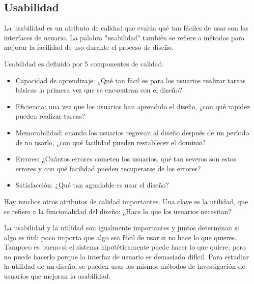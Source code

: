 \thispagestyle{plain}
\subsection{Usabilidad}
	\par 
		La usabilidad es un atributo de calidad que evalúa qué tan fáciles de usar son las interfaces de usuario. La palabra "usabilidad" también se refiere a métodos para mejorar la facilidad de uso durante el proceso de diseño.
	
	\par \noindent
		Usabilidad es definido por 5 componentes de calidad:
		
	\begin{itemize}
		\item Capacidad de aprendizaje: ¿Qué tan fácil es para los usuarios realizar tareas básicas la primera vez que se encuentran con el diseño?
		
		\item Eficiencia: una vez que los usuarios han aprendido el diseño, ¿con qué rapidez pueden realizar tareas?
		
		\item Memorabilidad: cuando los usuarios regresan al diseño después de un período de no usarlo, ¿con qué facilidad pueden restablecer el dominio?
		
		\item Errores: ¿Cuántos errores cometen los usuarios, qué tan severos son estos errores y con qué facilidad pueden recuperarse de los errores?
		
		\item Satisfacción: ¿Qué tan agradable es usar el diseño?
	\end{itemize}

\clearpage
\thispagestyle{plain}

	\par \noindent
		Hay muchos otros atributos de calidad importantes. Una clave es la utilidad, que se refiere a la funcionalidad del diseño: ¿Hace lo que los usuarios necesitan?
		
	\par \noindent
		La usabilidad y la utilidad son igualmente importantes y juntos determinan si algo es útil: poco importa que algo sea fácil de usar si no hace lo que quieres. Tampoco es bueno si el sistema hipotéticamente puede hacer lo que quiere, pero no puede hacerlo porque la interfaz de usuario es demasiado difícil. Para estudiar la utilidad de un diseño, se pueden usar los mismos métodos de investigación de usuarios que mejoran la usabilidad.
		
